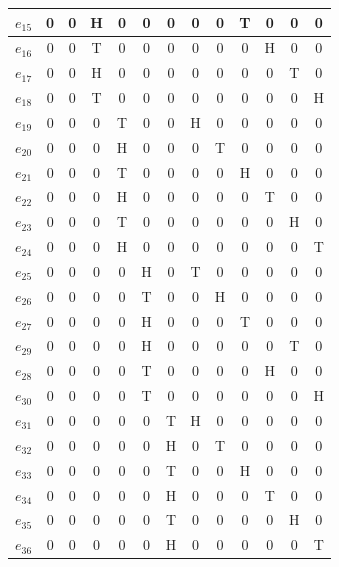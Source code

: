 \begin{example}
\begin{center}
\begin{tabular}{|c|c|c|c|c|c|c|c|c|c|c|c|c|}
            $e_{15}$ & 0 & 0 & H & 0 & 0 & 0 & 0 & 0 & T & 0 & 0 & 0 \\\hline
            $e_{16}$ & 0 & 0 & T & 0 & 0 & 0 & 0 & 0 & 0 & H & 0 & 0 \\\hline
            $e_{17}$ & 0 & 0 & H & 0 & 0 & 0 & 0 & 0 & 0 & 0 & T & 0 \\\hline
            $e_{18}$ & 0 & 0 & T & 0 & 0 & 0 & 0 & 0 & 0 & 0 & 0 & H \\\hline
            $e_{19}$ & 0 & 0 & 0 & T & 0 & 0 & H & 0 & 0 & 0 & 0 & 0 \\\hline
            $e_{20}$ & 0 & 0 & 0 & H & 0 & 0 & 0 & T & 0 & 0 & 0 & 0 \\\hline
            $e_{21}$ & 0 & 0 & 0 & T & 0 & 0 & 0 & 0 & H & 0 & 0 & 0 \\\hline
            $e_{22}$ & 0 & 0 & 0 & H & 0 & 0 & 0 & 0 & 0 & T & 0 & 0 \\\hline
            $e_{23}$ & 0 & 0 & 0 & T & 0 & 0 & 0 & 0 & 0 & 0 & H & 0 \\\hline
            $e_{24}$ & 0 & 0 & 0 & H & 0 & 0 & 0 & 0 & 0 & 0 & 0 & T \\\hline
            $e_{25}$ & 0 & 0 & 0 & 0 & H & 0 & T & 0 & 0 & 0 & 0 & 0 \\\hline
            $e_{26}$ & 0 & 0 & 0 & 0 & T & 0 & 0 & H & 0 & 0 & 0 & 0 \\\hline
            $e_{27}$ & 0 & 0 & 0 & 0 & H & 0 & 0 & 0 & T & 0 & 0 & 0 \\\hline
            $e_{29}$ & 0 & 0 & 0 & 0 & H & 0 & 0 & 0 & 0 & 0 & T & 0 \\\hline
            $e_{28}$ & 0 & 0 & 0 & 0 & T & 0 & 0 & 0 & 0 & H & 0 & 0 \\\hline
            $e_{30}$ & 0 & 0 & 0 & 0 & T & 0 & 0 & 0 & 0 & 0 & 0 & H \\\hline
            $e_{31}$ & 0 & 0 & 0 & 0 & 0 & T & H & 0 & 0 & 0 & 0 & 0 \\\hline
            $e_{32}$ & 0 & 0 & 0 & 0 & 0 & H & 0 & T & 0 & 0 & 0 & 0 \\\hline
            $e_{33}$ & 0 & 0 & 0 & 0 & 0 & T & 0 & 0 & H & 0 & 0 & 0 \\\hline
            $e_{34}$ & 0 & 0 & 0 & 0 & 0 & H & 0 & 0 & 0 & T & 0 & 0 \\\hline
            $e_{35}$ & 0 & 0 & 0 & 0 & 0 & T & 0 & 0 & 0 & 0 & H & 0 \\\hline
            $e_{36}$ & 0 & 0 & 0 & 0 & 0 & H & 0 & 0 & 0 & 0 & 0 & T \\\hline
        \end{tabular}
    \end{center}
\end{example}

